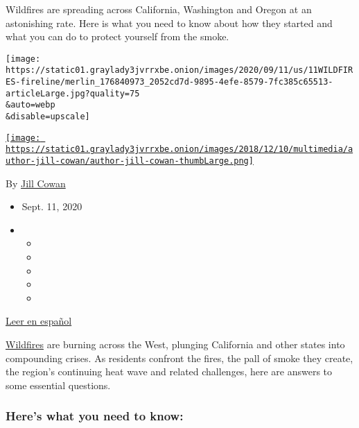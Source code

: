 Wildfires are spreading across California, Washington and Oregon at an
astonishing rate. Here is what you need to know about how they started
and what you can do to protect yourself from the smoke.

\texttt{[image: https://static01.graylady3jvrrxbe.onion/images/2020/09/11/us/11WILDFIRES-fireline/merlin\_176840973\_2052cd7d-9895-4efe-8579-7fc385c65513-articleLarge.jpg?quality=75\\\&auto=webp\\\&disable=upscale]}

\href{https://www.nytimes3xbfgragh.onion/by/jill-cowan}{\texttt{[image: https://static01.graylady3jvrrxbe.onion/images/2018/12/10/multimedia/author-jill-cowan/author-jill-cowan-thumbLarge.png]}}

By \href{https://www.nytimes3xbfgragh.onion/by/jill-cowan}{Jill Cowan}

\begin{itemize}
\item
  Sept. 11, 2020
\item
  \begin{itemize}
  \item
  \item
  \item
  \item
  \item
  \end{itemize}
\end{itemize}

\href{https://www.nytimes3xbfgragh.onion/es/2020/09/10/espanol/estados-unidos/incendios-california-oregon-washington.html}{Leer
en español}

\href{https://www.nytimes3xbfgragh.onion/2020/09/10/us/wildfires-help-ca-or-wa.html}{Wildfires}
are burning across the West, plunging California and other states into
compounding crises. As residents confront the fires, the pall of smoke
they create, the region's continuing heat wave and related challenges,
here are answers to some essential questions.

\hypertarget{heres-what-you-need-to-know}{%
\subsubsection{Here's what you need to
know:}\label{heres-what-you-need-to-know}}

